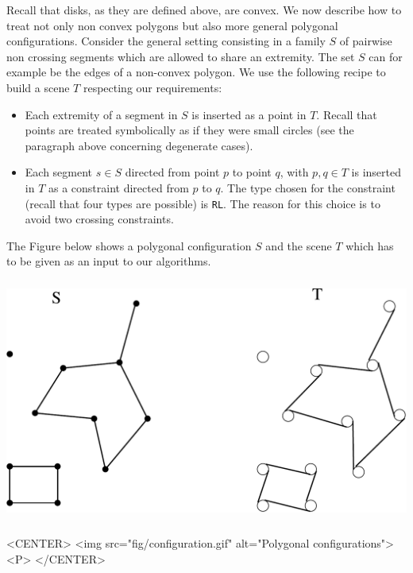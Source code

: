 Recall that disks, as they are defined above, are convex. We now describe
how to treat not only non convex polygons but also more general polygonal
configurations. Consider the general setting consisting in a family $S$ of
pairwise non crossing segments which are allowed to share an extremity. The
set $S$ can for example be the edges of a non-convex polygon.  We use the
following recipe to build a scene $T$ respecting our requirements:
\begin{itemize}
    \item Each extremity of a segment in $S$ is inserted as a point in $T$.
    Recall that points are treated symbolically as if they were small
    circles (see the paragraph above concerning degenerate cases).
    \item Each segment $s \in S$ directed from point $p$ to point $q$, with
    $p,q \in T$ is inserted in $T$ as a constraint directed from $p$ to
    $q$. The type chosen for the constraint (recall that four types are
    possible) is \texttt{RL}. The reason for this choice is to avoid two
    crossing constraints.
\end{itemize}

The Figure below shows a polygonal configuration $S$ and the scene $T$ which
has to be given as an input to our algorithms. 

\begin{ccTexOnly}
    \begin{center}
        \includegraphics[height=8cm]{Visibility_complex_2/fig/configuration}%
    \end{center}
\end{ccTexOnly}

\begin{ccHtmlOnly}
    <CENTER>
        <img src="fig/configuration.gif" alt="Polygonal configurations"><P>
    </CENTER>
\end{ccHtmlOnly}

